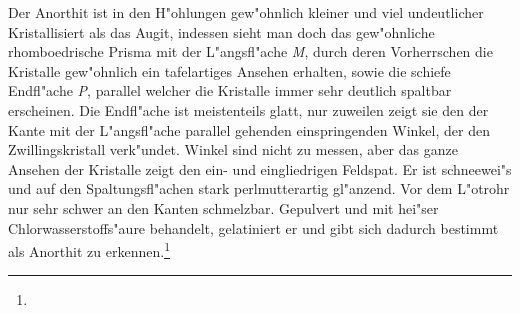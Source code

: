 \documentclass[a4paper, 11pt, oneside]{article}
\begin{document}
Der Anorthit ist in den H"ohlungen gew"ohnlich kleiner und viel undeutlicher Kristallisiert als das Augit, indessen sieht man doch das gew"ohnliche rhomboedrische Prisma mit der L"angsfl"ache \emph{M}, durch deren Vorherrschen die Kristalle gew"ohnlich ein tafelartiges Ansehen erhalten, sowie die schiefe Endfl"ache \emph{P}, parallel welcher die Kristalle immer sehr deutlich spaltbar erscheinen. Die Endfl"ache ist meistenteils glatt, nur zuweilen zeigt sie den der Kante mit der L"angsfl"ache parallel gehenden einspringenden Winkel, der den Zwillingskristall verk"undet. Winkel sind nicht zu messen, aber das ganze Ansehen der Kristalle zeigt den ein- und eingliedrigen Feldspat. Er ist schneewei"s und auf den Spaltungsfl"achen stark perlmutterartig gl"anzend. Vor dem L"otrohr nur sehr schwer an den Kanten schmelzbar. Gepulvert und mit hei"ser Chlorwasserstoffs"aure behandelt, gelatiniert er und gibt sich dadurch bestimmt als Anorthit zu erkennen.\footnote{}
\end{document}
